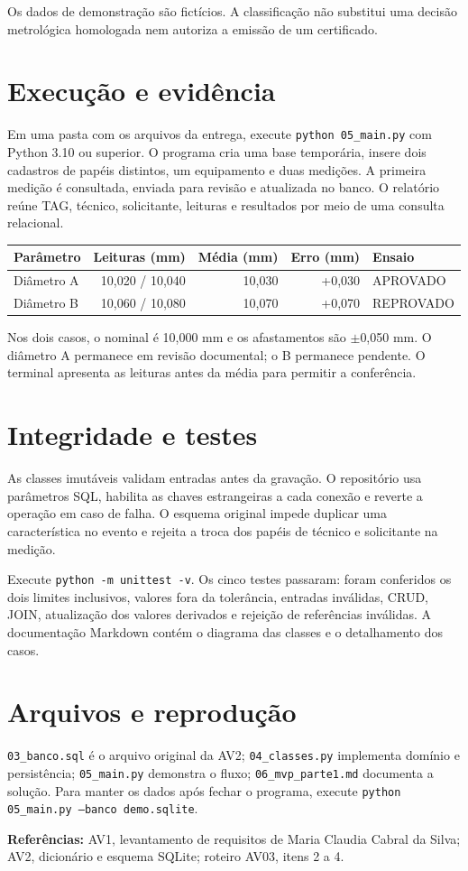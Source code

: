 \documentclass[12pt,a4paper]{article}
\begin{document}
Os dados de demonstração são fictícios. A classificação não substitui uma decisão metrológica homologada nem autoriza a emissão de um certificado.
\newpage
\section*{Execução e evidência}
Em uma pasta com os arquivos da entrega, execute \texttt{python 05\_main.py} com Python 3.10 ou superior. O programa cria uma base temporária, insere dois cadastros de papéis distintos, um equipamento e duas medições. A primeira medição é consultada, enviada para revisão e atualizada no banco. O relatório reúne TAG, técnico, solicitante, leituras e resultados por meio de uma consulta relacional.

\begin{center}
\small\begin{tabular}{@{}lrrrl@{}}
\toprule Parâmetro & Leituras (mm) & Média (mm) & Erro (mm) & Ensaio\\\midrule
Diâmetro A & 10,020 / 10,040 & 10,030 & +0,030 & APROVADO\\
Diâmetro B & 10,060 / 10,080 & 10,070 & +0,070 & REPROVADO\\\bottomrule
\end{tabular}
\end{center}
Nos dois casos, o nominal é 10,000 mm e os afastamentos são $\pm$0,050 mm. O diâmetro A permanece em revisão documental; o B permanece pendente. O terminal apresenta as leituras antes da média para permitir a conferência.

\section*{Integridade e testes}
As classes imutáveis validam entradas antes da gravação. O repositório usa parâmetros SQL, habilita as chaves estrangeiras a cada conexão e reverte a operação em caso de falha. O esquema original impede duplicar uma característica no evento e rejeita a troca dos papéis de técnico e solicitante na medição.

Execute \texttt{python -m unittest -v}. Os cinco testes passaram: foram conferidos os dois limites inclusivos, valores fora da tolerância, entradas inválidas, CRUD, JOIN, atualização dos valores derivados e rejeição de referências inválidas. A documentação Markdown contém o diagrama das classes e o detalhamento dos casos.

\section*{Arquivos e reprodução}
\texttt{03\_banco.sql} é o arquivo original da AV2; \texttt{04\_classes.py} implementa domínio e persistência; \texttt{05\_main.py} demonstra o fluxo; \texttt{06\_mvp\_parte1.md} documenta a solução. Para manter os dados após fechar o programa, execute \texttt{python 05\_main.py --banco demo.sqlite}.

{\small\textbf{Referências:} AV1, levantamento de requisitos de Maria Claudia Cabral da Silva; AV2, dicionário e esquema SQLite; roteiro AV03, itens 2 a 4.}
\end{document}
